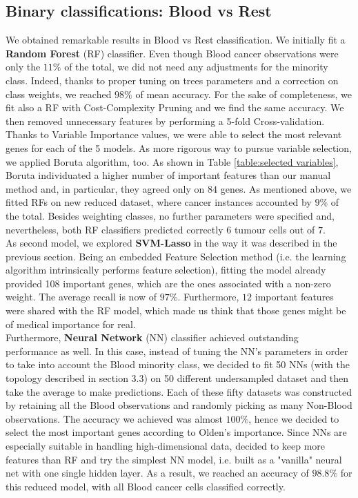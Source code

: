 \documentclass[a4paper,11pt, oneside]{article}  %
\begin{document}
	\subsection{Binary classifications: Blood vs Rest}
We obtained remarkable results in Blood vs Rest classification.  We initially fit a \textbf{Random Forest} (RF) classifier.  Even though Blood cancer observations were only the $11\%$ of the total,  we did not need any adjustments for the minority class.  Indeed,  thanks to proper tuning on trees parameters and a correction on class weights, we reached $98\%$ of mean accuracy.  For the sake of completeness,  we fit also a RF with Cost-Complexity Pruning and we find the same accuracy.  We then removed unnecessary features by performing a 5-fold Cross-validation.  Thanks to Variable Importance values,  we were able to select the most relevant genes for each of the 5 models.  As more rigorous way to pursue variable selection, we applied Boruta algorithm,  too.  As shown in Table \ref{table:selected variables},  Boruta individuated a higher number of important features than our manual method and, in particular, they agreed only on $84$ genes. As mentioned above,  we fitted RFs on new reduced dataset, where cancer instances accounted by $9\%$ of the total. Besides weighting classes, no further parameters were specified and, nevertheless, both RF classifiers predicted correctly $6$ tumour cells out of $7$.  \\
	
As second model,  we explored \textbf{SVM-Lasso} in the way it was described in the previous section.  Being an 
embedded Feature Selection method (i.e.  the learning algorithm intrinsically performs feature selection),  fitting the model already provided 108 important genes,  which are the ones associated with a non-zero weight.  The average recall is now of $97\%$.  Furthermore,  $12$ important features were shared with the RF model,  which made us think that those genes might be of medical importance for real.\\

Furthermore,  \textbf{Neural Network} (NN) classifier achieved outstanding performance as well.  In this case,  instead of tuning the NN's parameters in order to take into account the Blood minority class,  we decided to fit 50 NNs (with the topology described in section 3.3)  on 50 different undersampled dataset and then take the average to make predictions.   Each of these fifty datasets was constructed by retaining all the Blood observations and randomly picking as many Non-Blood observations.  The accuracy we achieved was almost $100\%$,  hence we decided to  select the most important genes according to Olden's importance.  Since NNs are especially suitable in handling high-dimensional data, decided to keep more features than RF and try the simplest NN model,  i.e.  built as a "vanilla" neural net with one single hidden layer.  As a result,  we reached an accuracy of $98.8\%$ for this reduced model,  with all Blood cancer cells classified correctly. 
	
\end{document}
